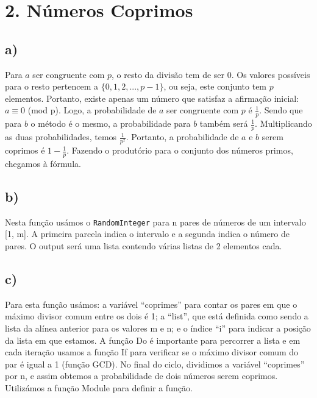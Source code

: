 \documentclass[12pt,a4paper]{article}
\begin{document}
    \newpage
    \section{2. Números Coprimos}
    \subsection{a)}
        Para \(a\) ser congruente com \(p\), o resto da divisão tem de ser 0. Os valores possíveis para o resto pertencem a \(\{0, 1, 2, ..., p-1\}\), ou seja, este conjunto tem \(p\) elementos. Portanto, existe apenas um número que satisfaz a afirmação inicial: \(a \equiv 0\) (mod p). Logo, a probabilidade de \(a\) ser congruente com \(p\) é \(\frac{1}{p}\). Sendo que para \(b\) o método é o mesmo, a probabilidade para \(b\) também será \(\frac{1}{p}\). Multiplicando as duas probabilidades, temos \(\frac{1}{p^2}\). Portanto, a probabilidade de \(a\) e \(b\) serem coprimos é \(1 - \frac{1}{p}\). Fazendo o produtório para o conjunto dos números primos, chegamos à fórmula.

    \subsection{b)}
        Nesta função usámos o \texttt{RandomInteger} para n pares de números de um intervalo [1, m]. A primeira parcela indica o intervalo e a segunda indica o número de pares. O output será uma lista contendo várias listas de 2 elementos cada.

    \subsection{c)}
        Para esta função usámos: a variável “coprimes” para contar os pares em que o máximo divisor comum entre os dois é 1; a “list”, que está definida como sendo a lista da alínea anterior para os valores m e n; e o índice “i” para indicar a posição da lista em que estamos. A função Do é importante para percorrer a lista e em cada iteração usamos a função If para verificar se o máximo divisor comum do par é igual a 1 (função GCD). No final do ciclo, dividimos a variável “coprimes” por n, e assim obtemos a probabilidade de dois números serem coprimos. Utilizámos a função Module para definir a função.
\end{document}
